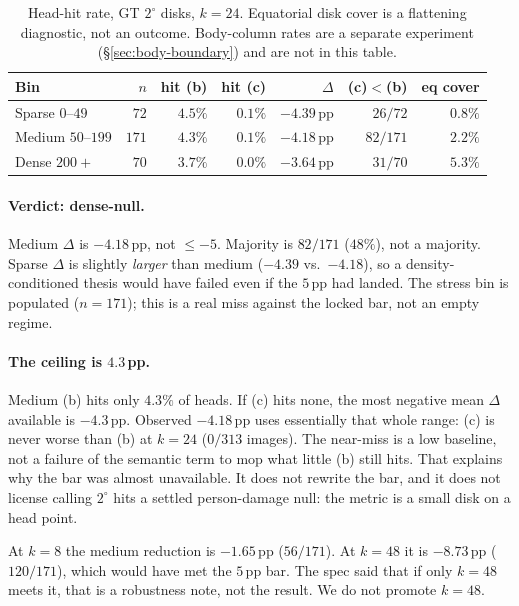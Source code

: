 \begin{table}[t]
\centering
\caption{Head-hit rate, GT $2^\circ$ disks, $k=24$. Equatorial disk
cover is a flattening diagnostic, not an outcome. Body-column rates
are a separate experiment (\S\ref{sec:body-boundary}) and are not in
this table.}
\label{tab:head-disks}
\begin{tabular}{lrrrrrr}
\toprule
Bin & $n$ & hit (b) & hit (c) & $\Delta$ & (c)$<$(b) & eq cover \\
\midrule
Sparse $0$--$49$ & $72$ & $4.5\%$ & $0.1\%$ & $-4.39$\,pp & $26/72$ & $0.8\%$ \\
Medium $50$--$199$ & $171$ & $4.3\%$ & $0.1\%$ & $-4.18$\,pp & $82/171$ & $2.2\%$ \\
Dense $200+$ & $70$ & $3.7\%$ & $0.0\%$ & $-3.64$\,pp & $31/70$ & $5.3\%$ \\
\bottomrule
\end{tabular}
\end{table}

\paragraph{Verdict: dense-null.}
Medium $\Delta$ is $-4.18$\,pp, not $\le -5$. Majority is $82/171$
($48\%$), not a majority. Sparse $\Delta$ is slightly \emph{larger}
than medium ($-4.39$ vs.\ $-4.18$), so a density-conditioned thesis
would have failed even if the $5$\,pp had landed. The stress bin is
populated ($n=171$); this is a real miss against the locked bar, not
an empty regime.

\paragraph{The ceiling is $4.3$\,pp.}
Medium (b) hits only $4.3\%$ of heads. If (c) hits none, the most
negative mean $\Delta$ available is $-4.3$\,pp. Observed $-4.18$\,pp
uses essentially that whole range: (c) is never worse than (b) at
$k=24$ ($0/313$ images). The near-miss is a low baseline, not a
failure of the semantic term to mop what little (b) still hits. That
explains why the bar was almost unavailable. It does not rewrite the
bar, and it does not license calling $2^\circ$ hits a settled
person-damage null: the metric is a small disk on a head point.

At $k=8$ the medium reduction is $-1.65$\,pp ($56/171$). At $k=48$ it
is $-8.73$\,pp ($120/171$), which would have met the $5$\,pp bar. The
spec said that if only $k=48$ meets it, that is a robustness note, not
the result. We do not promote $k=48$.

